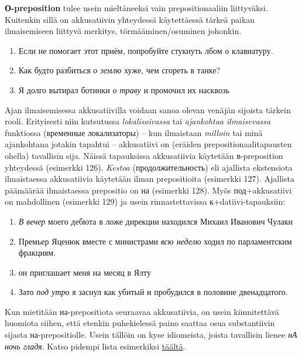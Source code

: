 \documentclass[]{scrreprt}
\providecommand{\tightlist}{%
  \setlength{\itemsep}{0pt}\setlength{\parskip}{0pt}}
\begin{document}
\textbf{О-preposition} tulee usein mieltäneeksi vain prepositionaaliin
liittyväksi. Kuitenkin sillä on akkusatiivin yhteydessä käytettäessä
tärkeä paikan ilmaisemiseen liittyvä merkitys, törmääminen/osuminen
johonkin.

\begin{enumerate}
\def\labelenumi{(\arabic{enumi})}
\setcounter{enumi}{122}
\tightlist
\item
  Если не помогает этот приём, попробуйте стукнуть лбом о клавиатуру.
\item
  Как будто разбиться \emph{о землю} хуже, чем сгореть в танке?
\item
  Я долго вытирал ботинки \emph{о траву} и промочил их насквозь
\end{enumerate}

Ajan ilmaisemisessa akkusatiivilla voidaan sanoa olevan venäjän sijoista
tärkein rooli. Erityisesti niin kutsutussa \emph{lokalisoivassa} tai
\emph{ajankohtaa ilmaisevassa} funktiossa (временные локализаторы) --
kun ilmaistaan \emph{milloin} tai minä ajankohtana jotakin tapahtui --
akkusatiivi on (eräiden prepositionaalitapausten ohella) tavallisin
sija. Näissä tapauksissa akkusatiivia käytetään в-preposition yhteydessä
(esimerkki 126). \emph{Kestoa} (продолжительность) eli ajallista
ekstensiota ilmaistaessa akkusatiivia käytetään ilman prepositioita
(esimerkki 127). Ajallista päämäärää ilmaistaessa prepositio on на
(esimerkki 128). Myös под+akkusatiivi on mahdollinen (esimerkki 129) ja
usein rinnastettavissa к+datiivi-tapauksiin:

\begin{enumerate}
\def\labelenumi{(\arabic{enumi})}
\setcounter{enumi}{125}
\tightlist
\item
  \emph{В вечер} моего дебюта в ложе дирекции находился Михаил Иванович
  Чулаки
\item
  Премьер Яценюк вместе с министрами \emph{всю неделю} ходил по
  парламентским фракциям.
\item
  он приглашает меня на месяц в Ялту
\item
  Зато \emph{под утро} я заснул как убитый и пробудился в половине
  двенадцатого.
\end{enumerate}

Kun mietitään на-prepositiota seuraavaa akkusatiivia, on usein
kiinnitettävä huomiota siihen, että etenkin puhekielessä paino saattaa
osua substantiivin sijasta на-prepositiolle. Usein tällöin on kyse
idiomeista, joista tavallisin lienee \emph{нА ночь гладя}. Katso pidempi
lista esimerkiksi
\href{http://fonetica.philol.msu.ru/akcent/bezud_slaboud/ud_na_pr.html}{täältä}.
\end{document}
